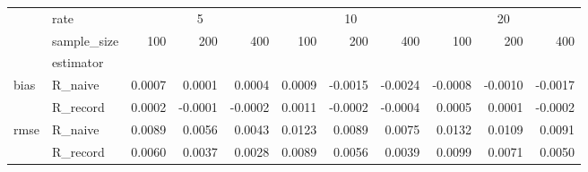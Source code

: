 \begin{tabular}{llrrrrrrrrr}
\toprule
{} & {rate} & \multicolumn{3}{c}{5} & \multicolumn{3}{c}{10} & \multicolumn{3}{c}{20} \\
{} & {sample_size} & {100} & {200} & {400} & {100} & {200} & {400} & {100} & {200} & {400} \\
{} & {estimator} & {} & {} & {} & {} & {} & {} & {} & {} & {} \\
\midrule
\multirow[c]{2}{*}{bias} & R_naive & 0.0007 & 0.0001 & 0.0004 & 0.0009 & -0.0015 & -0.0024 & -0.0008 & -0.0010 & -0.0017 \\
 & R_record & 0.0002 & -0.0001 & -0.0002 & 0.0011 & -0.0002 & -0.0004 & 0.0005 & 0.0001 & -0.0002 \\
\multirow[c]{2}{*}{rmse} & R_naive & 0.0089 & 0.0056 & 0.0043 & 0.0123 & 0.0089 & 0.0075 & 0.0132 & 0.0109 & 0.0091 \\
 & R_record & 0.0060 & 0.0037 & 0.0028 & 0.0089 & 0.0056 & 0.0039 & 0.0099 & 0.0071 & 0.0050 \\
\bottomrule
\end{tabular}
